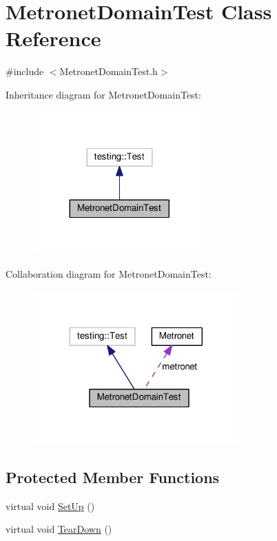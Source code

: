 \hypertarget{class_metronet_domain_test}{}\section{Metronet\+Domain\+Test Class Reference}
\label{class_metronet_domain_test}


{\ttfamily \#include $<$Metronet\+Domain\+Test.\+h$>$}



Inheritance diagram for Metronet\+Domain\+Test\+:
\nopagebreak
\begin{figure}[H]
\begin{center}
\leavevmode
\includegraphics[width=188pt]{class_metronet_domain_test__inherit__graph}
\end{center}
\end{figure}


Collaboration diagram for Metronet\+Domain\+Test\+:
\nopagebreak
\begin{figure}[H]
\begin{center}
\leavevmode
\includegraphics[width=224pt]{class_metronet_domain_test__coll__graph}
\end{center}
\end{figure}
\subsection*{Protected Member Functions}
\begin{DoxyCompactItemize}
\item 
virtual void \hyperlink{class_metronet_domain_test_ac8e8d15b45d53810c4427084fad6388f}{Set\+Up} ()
\item 
virtual void \hyperlink{class_metronet_domain_test_a3429b373771815652c80d013f81369a0}{Tear\+Down} ()
\end{DoxyCompactItemize}
